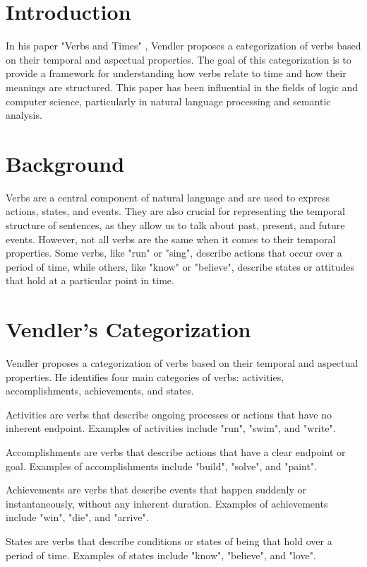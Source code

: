 \section{Introduction}

In his paper "Verbs and Times" \cite{vendler1957verbs}, Vendler proposes a categorization of verbs based on their temporal and aspectual properties. The goal of this categorization is to provide a framework for understanding how verbs relate to time and how their meanings are structured. This paper has been influential in the fields of logic and computer science, particularly in natural language processing and semantic analysis.

\section{Background}

Verbs are a central component of natural language and are used to express actions, states, and events. They are also crucial for representing the temporal structure of sentences, as they allow us to talk about past, present, and future events. However, not all verbs are the same when it comes to their temporal properties. Some verbs, like "run" or "sing", describe actions that occur over a period of time, while others, like "know" or "believe", describe states or attitudes that hold at a particular point in time.

\section{Vendler's Categorization}

Vendler proposes a categorization of verbs based on their temporal and aspectual properties. He identifies four main categories of verbs: activities, accomplishments, achievements, and states.

Activities are verbs that describe ongoing processes or actions that have no inherent endpoint. Examples of activities include "run", "swim", and "write".

Accomplishments are verbs that describe actions that have a clear endpoint or goal. Examples of accomplishments include "build", "solve", and "paint".

Achievements are verbs that describe events that happen suddenly or instantaneously, without any inherent duration. Examples of achievements include "win", "die", and "arrive".

States are verbs that describe conditions or states of being that hold over a period of time. Examples of states include "know", "believe", and "love".

